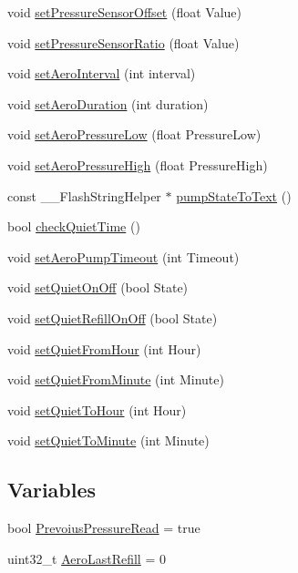 \begin{DoxyCompactItemize}
void \mbox{\hyperlink{_aeroponics_8ino_a0472e5352826e59a5c7dfa412ed359df}{set\+Pressure\+Sensor\+Offset}} (float Value)
\item 
void \mbox{\hyperlink{_aeroponics_8ino_a76c21e0dba5014e2f2cdb5739690170a}{set\+Pressure\+Sensor\+Ratio}} (float Value)
\item 
void \mbox{\hyperlink{_aeroponics_8ino_a6dd8d8bfdded279feb03a4192844b54f}{set\+Aero\+Interval}} (int interval)
\item 
void \mbox{\hyperlink{_aeroponics_8ino_adcb385a6c69e09ad4ad1dd3cc1637694}{set\+Aero\+Duration}} (int duration)
\item 
void \mbox{\hyperlink{_aeroponics_8ino_aaa624d869d52ed407c5a31a9131b8a39}{set\+Aero\+Pressure\+Low}} (float Pressure\+Low)
\item 
void \mbox{\hyperlink{_aeroponics_8ino_a1193a6a23d0e754645ed16bc2bd8b8ca}{set\+Aero\+Pressure\+High}} (float Pressure\+High)
\item 
const \+\_\+\+\_\+\+Flash\+String\+Helper $\ast$ \mbox{\hyperlink{_aeroponics_8ino_a9bce754224237f28c8829aa5ca525dbf}{pump\+State\+To\+Text}} ()
\item 
bool \mbox{\hyperlink{_aeroponics_8ino_a8ce2c963794ec52c6a3eb9e861f0a6d0}{check\+Quiet\+Time}} ()
\item 
void \mbox{\hyperlink{_aeroponics_8ino_a3e14ba4db1e3a91a8703e58d3d3ddbaf}{set\+Aero\+Pump\+Timeout}} (int Timeout)
\item 
void \mbox{\hyperlink{_aeroponics_8ino_a7baea56d0669cb68d93b050a42de96fe}{set\+Quiet\+On\+Off}} (bool State)
\item 
void \mbox{\hyperlink{_aeroponics_8ino_a0cd33e49bb5cbaf7ad545d3b1d65283b}{set\+Quiet\+Refill\+On\+Off}} (bool State)
\item 
void \mbox{\hyperlink{_aeroponics_8ino_a913932a7a16c2d8a5f017b7dece91be0}{set\+Quiet\+From\+Hour}} (int Hour)
\item 
void \mbox{\hyperlink{_aeroponics_8ino_a932d3d547294916c9e3fa435a6c97103}{set\+Quiet\+From\+Minute}} (int Minute)
\item 
void \mbox{\hyperlink{_aeroponics_8ino_af9578971f972999d11f358bc11eee209}{set\+Quiet\+To\+Hour}} (int Hour)
\item 
void \mbox{\hyperlink{_aeroponics_8ino_a156a9004b503cc67faa39b569f43f189}{set\+Quiet\+To\+Minute}} (int Minute)
\end{DoxyCompactItemize}
\subsection*{Variables}
\begin{DoxyCompactItemize}
\item 
bool \mbox{\hyperlink{_aeroponics_8ino_ad04b57c789ee14d3cb605c29ee802570}{Prevoius\+Pressure\+Read}} = true
\item 
uint32\+\_\+t \mbox{\hyperlink{_aeroponics_8ino_a77df1b16c77d0eb7c47f8a15b6dfe425}{Aero\+Last\+Refill}} = 0
\end{DoxyCompactItemize}


